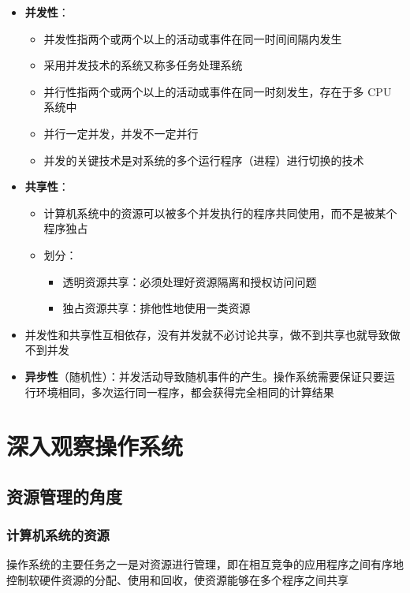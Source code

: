 \documentclass[cs4size,a4paper,10pt]{ctexart}
\begin{document}
		\begin{itemize}
			\item \textbf{并发性}：
			\begin{itemize}
				\item 并发性指两个或两个以上的活动或事件在同一时间间隔内发生
				\item 采用并发技术的系统又称多任务处理系统
				\item 并行性指两个或两个以上的活动或事件在同一时刻发生，存在于多 CPU 系统中
				\item 并行一定并发，并发不一定并行
				\item 并发的关键技术是对系统的多个运行程序（进程）进行切换的技术
			\end{itemize}
			\item \textbf{共享性}：
			\begin{itemize}
				\item 计算机系统中的资源可以被多个并发执行的程序共同使用，而不是被某个程序独占
				\item 划分：
				\begin{itemize}
					\item 透明资源共享：必须处理好资源隔离和授权访问问题
					\item 独占资源共享：排他性地使用一类资源
				\end{itemize}
			\end{itemize}
			\item 并发性和共享性互相依存，没有并发就不必讨论共享，做不到共享也就导致做不到并发
			\item \textbf{异步性}（随机性）：并发活动导致随机事件的产生。操作系统需要保证只要运行环境相同，多次运行同一程序，都会获得完全相同的计算结果
		\end{itemize}


		\section{深入观察操作系统}
		\subsection{资源管理的角度}

		\subsubsection{计算机系统的资源}
		操作系统的主要任务之一是对资源进行管理，即在相互竞争的应用程序之间有序地控制软硬件资源的分配、使用和回收，使资源能够在多个程序之间共享
\end{document}
